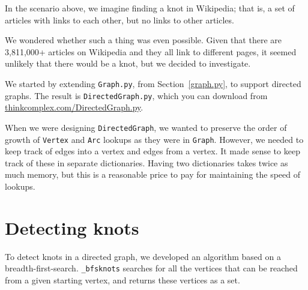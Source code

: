 \documentclass[10pt]{book}
\begin{document}
In the scenario above, we imagine finding a knot in Wikipedia;
that is, a set of articles with links to each other, but no
links to other articles.

We wondered whether such a thing was even possible. Given that there
are 3,811,000+ articles on Wikipedia and they all link to different
pages, it seemed unlikely that there would be a knot, but we decided
to investigate.

We started by extending \verb"Graph.py", from Section~\ref{graph.py}, to
support directed graphs. The result is \verb"DirectedGraph.py", which
you can download from \url{thinkcomplex.com/DirectedGraph.py}.

When we were designing \verb"DirectedGraph", we wanted to preserve the
order of growth of \verb"Vertex" and \verb"Arc" lookups as they were
in \verb"Graph".  However, we needed to keep track of edges into a
vertex and edges from a vertex. It made sense to keep track of these
in separate dictionaries. Having two
dictionaries takes twice as much memory, but this is a
reasonable price to pay for maintaining the speed of lookups.

\section{Detecting knots}


To detect knots in a directed graph, we developed an algorithm based
on a breadth-first-search. \verb"_bfsknots" searches for all the
vertices that can be reached from a given starting vertex, and returns
these vertices as a set.
\end{document}
